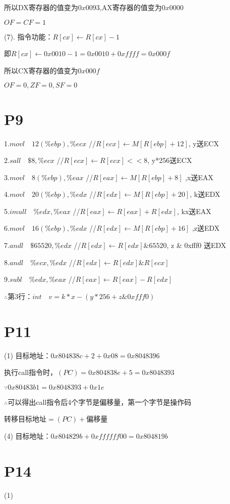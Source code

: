 \documentclass{article}
\begin{document}
所以DX寄存器的值变为$0x0093$,AX寄存器的值变为$0x0000$

$OF=CF=1$

(7). 指令功能：$R[cx] \gets R[cx]-1$

即$R[cx] \gets 0x0010-1 = 0x0010+0xffff=0x000f$

所以CX寄存器的值变为$0x000f$	

$OF=0,ZF=0,SF=0$

\section{P9}
1.$movl \quad 12(\% ebp), \% ecx$  \quad //$R[ecx] \gets M[R[ebp]+12]$, y送ECX

2.$sall \quad \$ 8, \% ecx$  \quad //$R[ecx] \gets R[ecx]<<8$, y*256送ECX

3.$movl \quad 8(\% ebp), \% eax$  \quad //$R[eax] \gets M[R[ebp]+8]$ ,x送EAX

4.$movl \quad 20(\% ebp), \% edx$ \quad  //$R[edx] \gets M[R[ebp]+20]$, k送EDX

5.$imull \quad \% edx, \% eax$  \quad //$R[eax] \gets R[eax]+R[edx]$, kx送EAX

6.$movl \quad 16(\% ebp), \% edx$  \quad //$R[edx] \gets M[R[ebp]+16]$ ,z送EDX

7.$andl \quad \$ 65520, \% edx$  \quad //$R[edx] \gets R[edx] \& 65520$, z \& 0xfff0 送EDX

8.$andl \quad \% ecx, \% edx$  \quad //$R[edx] \gets R[edx] \& R[ecx]$

9.$subl \quad \% edx, \% eax$  \quad //$R[eax] \gets R[eax] - R[edx] $

$\therefore$第3行：$int \quad v = k * x - (y * 256 + z \& 0xfff0)$

\section{P11}
(1) 目标地址：$0x804838c+2+0x08=0x8048396$

执行call指令时，$(PC)=0x804838e+5=0x8048393$

$\because 0x80483b1=0x8048393+0x1e$

$\therefore$可以得出call指令后4个字节是偏移量，第一个字节是操作码

转移目标地址$=(PC)+$偏移量

(4) 目标地址：$0x804829b+0xffffff00=0x804819b$

\section{P14}
(1)
\end{document}
